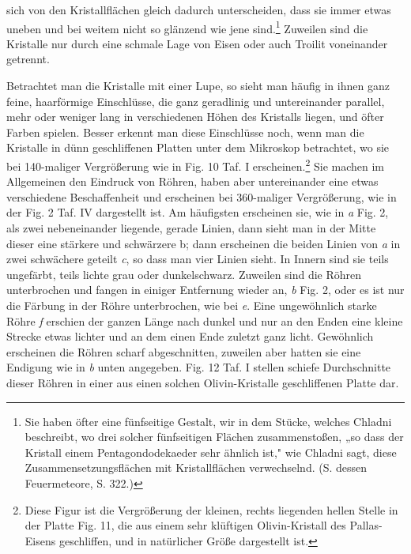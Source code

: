 \documentclass[a4paper, 11pt, oneside]{article}
\begin{document}
sich von den Kristallflächen gleich dadurch unterscheiden, dass sie immer etwas uneben und bei weitem nicht so glänzend wie jene sind.\footnote{Sie haben öfter eine fünfseitige Gestalt, wir in dem Stücke, welches Chladni beschreibt, wo drei solcher fünfseitigen Flächen zusammenstoßen, „so dass der Kristall einem Pentagondodekaeder sehr ähnlich ist," wie Chladni sagt, diese Zusammensetzungsflächen mit Kristallflächen verwechselnd. (S. dessen Feuermeteore, S. 322.)} Zuweilen sind die Kristalle nur durch eine schmale Lage von Eisen oder auch Troilit voneinander getrennt.

Betrachtet man die Kristalle mit einer Lupe, so sieht man häufig in ihnen ganz feine, haarförmige Einschlüsse, die ganz geradlinig und untereinander parallel, mehr oder weniger lang in verschiedenen Höhen des Kristalls liegen, und öfter Farben spielen. Besser erkennt man diese Einschlüsse noch, wenn man die Kristalle in dünn geschliffenen Platten unter dem Mikroskop betrachtet, wo sie bei 140-maliger Vergrößerung wie in Fig. 10 Taf. I erscheinen.\footnote{Diese Figur ist die Vergrößerung der kleinen, rechts liegenden hellen Stelle in der Platte Fig. 11, die aus einem sehr klüftigen Olivin-Kristall des Pallas-Eisens geschliffen, und in natürlicher Größe dargestellt ist.} Sie machen im Allgemeinen den Eindruck von Röhren, haben aber untereinander eine etwas verschiedene Beschaffenheit und erscheinen bei 360-maliger Vergrößerung, wie in der Fig. 2 Taf. IV dargestellt ist. Am häufigsten erscheinen sie, wie in \emph{a} Fig. 2, als zwei nebeneinander liegende, gerade Linien, dann sieht man in der Mitte dieser eine stärkere und schwärzere b; dann erscheinen die beiden Linien von \emph{a} in zwei schwächere geteilt \emph{c}, so dass man vier Linien sieht. In Innern sind sie teils ungefärbt, teils lichte grau oder dunkelschwarz. Zuweilen sind die Röhren unterbrochen und fangen in einiger Entfernung wieder an, \emph{b} Fig. 2, oder es ist nur die Färbung in der Röhre unterbrochen, wie bei \emph{e}. Eine ungewöhnlich starke Röhre \emph{f} erschien der ganzen Länge nach dunkel und nur an den Enden eine kleine Strecke etwas lichter und an dem einen Ende zuletzt ganz licht. Gewöhnlich erscheinen die Röhren scharf abgeschnitten, zuweilen aber hatten sie eine Endigung wie in \emph{b} unten angegeben. Fig. 12 Taf. I stellen schiefe Durchschnitte dieser Röhren in einer aus einen solchen Olivin-Kristalle geschliffenen Platte dar.
\end{document}
